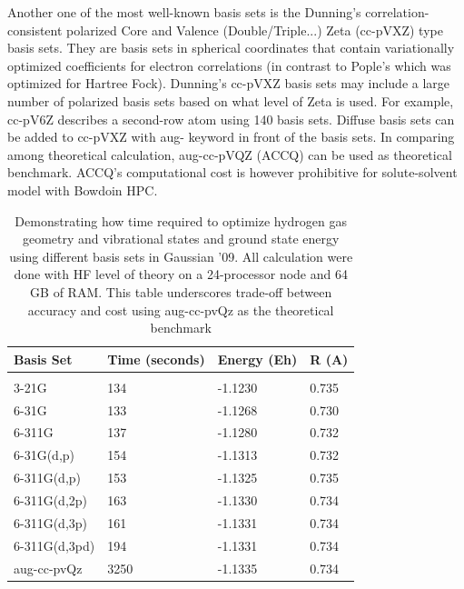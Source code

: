 \documentclass[
journal=jpcbfk, %
manuscript=article]{achemso}
\begin{document}
	Another one of the most well-known basis sets is the Dunning's correlation-consistent polarized Core and Valence (Double/Triple...) Zeta (cc-pVXZ) type basis sets. They are basis sets in spherical coordinates that contain variationally optimized coefficients for electron correlations (in contrast to Pople's which was optimized for Hartree Fock). Dunning's cc-pVXZ basis sets may include a large number of polarized basis sets based on what level of Zeta is used. For example, cc-pV6Z describes a second-row atom using 140 basis sets.\cite{Cramer2005} Diffuse basis sets can be added to cc-pVXZ with aug- keyword in front of the basis sets. In comparing among theoretical calculation, aug-cc-pVQZ (ACCQ) can be used as theoretical benchmark.\cite{Rohrdanz2008,Barnes2014} ACCQ's computational cost is however prohibitive for solute-solvent model with Bowdoin HPC. 
	\begin{table}[ht]
		\centering
		\caption{Demonstrating how time required to optimize hydrogen gas geometry and vibrational states and ground state energy using different basis sets in Gaussian '09. All calculation were done with HF level of theory on a 24-processor node and 64 GB of RAM. This table underscores trade-off between accuracy and cost using aug-cc-pvQz as the theoretical benchmark}\label{Table:benchmarkBasisSets}
		\centering
		\begin{tabular}{llll}
			Basis Set	&	Time (seconds)	&	Energy (Eh)	&	R (A) \\ [0.5ex]
			\hline\hline
			\\[-0.5ex]
			3-21G	&	134	&	-1.1230	&	0.735 \\
			6-31G	&	133	&	-1.1268	&	0.730 \\
			6-311G	&	137	&	-1.1280	&	0.732 \\
			6-31G(d,p)	&	154	&	-1.1313	&	0.732 \\
			6-311G(d,p)	&	153	&	-1.1325	&	0.735 \\
			6-311G(d,2p)	&	163	&	-1.1330	&	0.734 \\
			6-311G(d,3p)	&	161	&	-1.1331	&	0.734 \\
			6-311G(d,3pd)	&	194	&	-1.1331	&	0.734 \\
			aug-cc-pvQz	&	3250	&	-1.1335	&	0.734 \\
		\end{tabular}
	\end{table}
	
\end{document}
